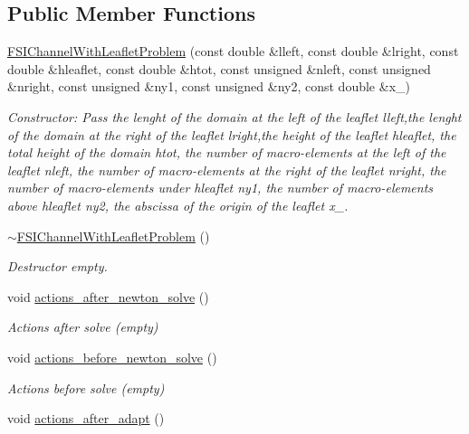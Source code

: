 \subsection*{Public Member Functions}
\begin{DoxyCompactItemize}
\item 
\hyperlink{classFSIChannelWithLeafletProblem_aaa0a455e91c4fb2dd9696607b802d01b}{F\+S\+I\+Channel\+With\+Leaflet\+Problem} (const double \&lleft, const double \&lright, const double \&hleaflet, const double \&htot, const unsigned \&nleft, const unsigned \&nright, const unsigned \&ny1, const unsigned \&ny2, const double \&x\+\_)
\begin{DoxyCompactList}\small\item\em Constructor\+: Pass the lenght of the domain at the left of the leaflet lleft,the lenght of the domain at the right of the leaflet lright,the height of the leaflet hleaflet, the total height of the domain htot, the number of macro-\/elements at the left of the leaflet nleft, the number of macro-\/elements at the right of the leaflet nright, the number of macro-\/elements under hleaflet ny1, the number of macro-\/elements above hleaflet ny2, the abscissa of the origin of the leaflet x\+\_. \end{DoxyCompactList}\item 
\hyperlink{classFSIChannelWithLeafletProblem_a5df1d8f7229314a92ffb48ec61f56fe0}{$\sim$\+F\+S\+I\+Channel\+With\+Leaflet\+Problem} ()
\begin{DoxyCompactList}\small\item\em Destructor empty. \end{DoxyCompactList}\item 
void \hyperlink{classFSIChannelWithLeafletProblem_abff6e46a940263c9255a61f649bb4239}{actions\+\_\+after\+\_\+newton\+\_\+solve} ()
\begin{DoxyCompactList}\small\item\em Actions after solve (empty) \end{DoxyCompactList}\item 
void \hyperlink{classFSIChannelWithLeafletProblem_a8a32ef77f32b3283b4b509669deb0a11}{actions\+\_\+before\+\_\+newton\+\_\+solve} ()
\begin{DoxyCompactList}\small\item\em Actions before solve (empty) \end{DoxyCompactList}\item 
void \hyperlink{classFSIChannelWithLeafletProblem_acc3f4745ea9b4524aebbc4f2556d1286}{actions\+\_\+after\+\_\+adapt} ()

\end{DoxyCompactItemize}
